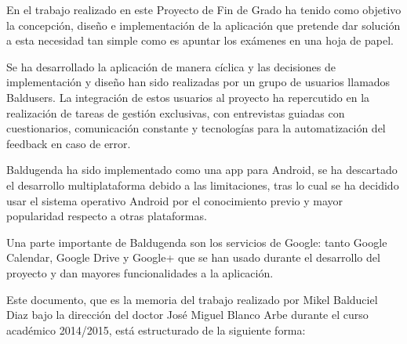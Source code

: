 En el trabajo realizado en este Proyecto de Fin de Grado ha tenido como objetivo la concepción, diseño e implementación de la aplicación que pretende dar solución a esta necesidad tan simple como es apuntar los exámenes en una hoja de papel.

Se ha desarrollado la aplicación de manera cíclica y las decisiones de implementación y diseño han sido realizadas por un grupo de usuarios llamados \glspl{Balduser}. La integración de estos usuarios al proyecto ha repercutido en la realización de tareas de gestión exclusivas, con entrevistas guiadas con cuestionarios, comunicación constante y tecnologías para la automatización del feedback en caso de error.

\gls{Baldugenda} ha sido implementado como una app para Android, se ha descartado el desarrollo multiplataforma debido a las limitaciones, tras lo cual se ha decidido usar el sistema operativo Android por el conocimiento previo y mayor popularidad respecto a otras plataformas.

Una parte importante de Baldugenda son los servicios de Google: tanto Google Calendar, Google Drive y Google+ que se han usado durante el desarrollo del proyecto y dan mayores funcionalidades a la aplicación.

Este documento, que es la memoria del trabajo realizado por Mikel Balduciel Diaz
bajo la dirección del doctor José Miguel Blanco Arbe durante el curso académico 2014/2015, está estructurado de la siguiente forma:


